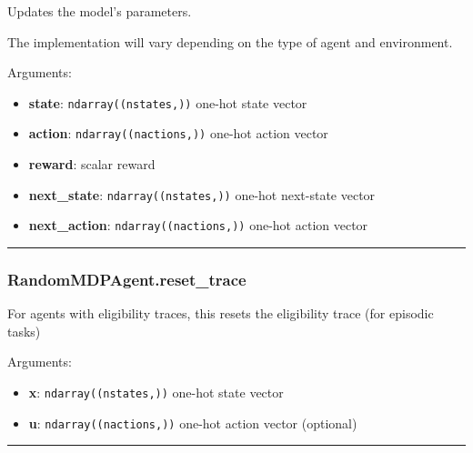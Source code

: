 Updates the model's parameters.

The implementation will vary depending on the type of agent and
environment.

Arguments:

\begin{itemize}
\tightlist
\item
  \textbf{state}: \texttt{ndarray((nstates,))} one-hot state vector
\item
  \textbf{action}: \texttt{ndarray((nactions,))} one-hot action vector
\item
  \textbf{reward}: scalar reward
\item
  \textbf{next\_state}: \texttt{ndarray((nstates,))} one-hot next-state
  vector
\item
  \textbf{next\_action}: \texttt{ndarray((nactions,))} one-hot action
  vector
\end{itemize}

\begin{center}\rule{0.5\linewidth}{\linethickness}\end{center}

\hypertarget{randommdpagent.reset_trace}{%
\subsubsection{RandomMDPAgent.reset\_trace}\label{randommdpagent.reset_trace}}

\begin{Shaded}
\begin{Highlighting}[]
\OperatorTok{=}\NormalTok{)}
\end{Highlighting}
\end{Shaded}

For agents with eligibility traces, this resets the eligibility trace
(for episodic tasks)

Arguments:

\begin{itemize}
\tightlist
\item
  \textbf{x}: \texttt{ndarray((nstates,))} one-hot state vector
\item
  \textbf{u}: \texttt{ndarray((nactions,))} one-hot action vector
  (optional)
\end{itemize}

\begin{center}\rule{0.5\linewidth}{\linethickness}\end{center}

